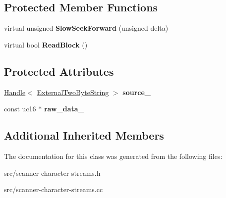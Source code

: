 \subsection*{Protected Member Functions}
\begin{DoxyCompactItemize}
\item 
\hypertarget{classv8_1_1internal_1_1_external_two_byte_string_utf16_character_stream_ae346a24392faa9c4ce50d504f6460f60}{}virtual unsigned {\bfseries Slow\+Seek\+Forward} (unsigned delta)\label{classv8_1_1internal_1_1_external_two_byte_string_utf16_character_stream_ae346a24392faa9c4ce50d504f6460f60}

\item 
\hypertarget{classv8_1_1internal_1_1_external_two_byte_string_utf16_character_stream_ab3b6ee98c7b77c8a11bc9fed19befacc}{}virtual bool {\bfseries Read\+Block} ()\label{classv8_1_1internal_1_1_external_two_byte_string_utf16_character_stream_ab3b6ee98c7b77c8a11bc9fed19befacc}

\end{DoxyCompactItemize}
\subsection*{Protected Attributes}
\begin{DoxyCompactItemize}
\item 
\hypertarget{classv8_1_1internal_1_1_external_two_byte_string_utf16_character_stream_a09eb9109a053bf71a42d3830e5b9e9c2}{}\hyperlink{classv8_1_1internal_1_1_handle}{Handle}$<$ \hyperlink{classv8_1_1internal_1_1_external_two_byte_string}{External\+Two\+Byte\+String} $>$ {\bfseries source\+\_\+}\label{classv8_1_1internal_1_1_external_two_byte_string_utf16_character_stream_a09eb9109a053bf71a42d3830e5b9e9c2}

\item 
\hypertarget{classv8_1_1internal_1_1_external_two_byte_string_utf16_character_stream_afd50205c07147770b784f86ba3b09929}{}const uc16 $\ast$ {\bfseries raw\+\_\+data\+\_\+}\label{classv8_1_1internal_1_1_external_two_byte_string_utf16_character_stream_afd50205c07147770b784f86ba3b09929}

\end{DoxyCompactItemize}
\subsection*{Additional Inherited Members}


The documentation for this class was generated from the following files\+:\begin{DoxyCompactItemize}
\item 
src/scanner-\/character-\/streams.\+h\item 
src/scanner-\/character-\/streams.\+cc\end{DoxyCompactItemize}
